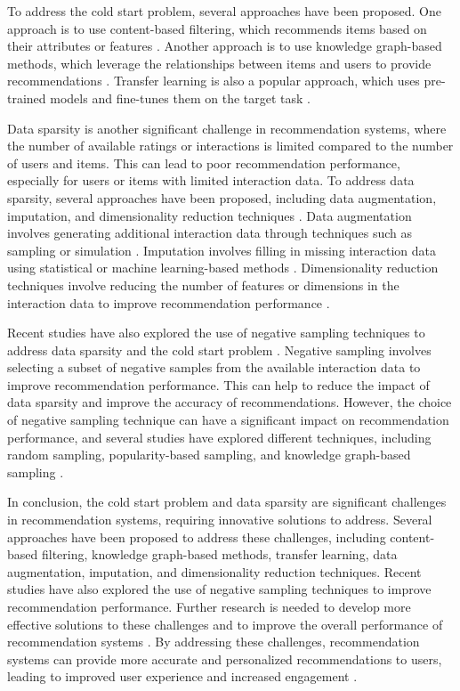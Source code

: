 \documentclass[11pt,a4paper]{article}
\begin{document}
To address the cold start problem, several approaches have been proposed. One approach is to use content-based filtering, which recommends items based on their attributes or features \cite{doi:10.1016/j.knosys.2011.07.021}. Another approach is to use knowledge graph-based methods, which leverage the relationships between items and users to provide recommendations \cite{doi:10.1007/s10115-014-0779-2}. Transfer learning is also a popular approach, which uses pre-trained models and fine-tunes them on the target task \cite{doi:10.1145/3543507.3583495}.

Data sparsity is another significant challenge in recommendation systems, where the number of available ratings or interactions is limited compared to the number of users and items. This can lead to poor recommendation performance, especially for users or items with limited interaction data. To address data sparsity, several approaches have been proposed, including data augmentation, imputation, and dimensionality reduction techniques \cite{doi:10.1587/transinf.2017edr0003}. Data augmentation involves generating additional interaction data through techniques such as sampling or simulation \cite{doi:10.1145/3488560.3498439}. Imputation involves filling in missing interaction data using statistical or machine learning-based methods \cite{doi:10.1002/cpe.7894}. Dimensionality reduction techniques involve reducing the number of features or dimensions in the interaction data to improve recommendation performance \cite{doi:10.1145/3589334.3645371}.

Recent studies have also explored the use of negative sampling techniques to address data sparsity and the cold start problem \cite{doi:10.1145/3331184.3331337}. Negative sampling involves selecting a subset of negative samples from the available interaction data to improve recommendation performance. This can help to reduce the impact of data sparsity and improve the accuracy of recommendations. However, the choice of negative sampling technique can have a significant impact on recommendation performance, and several studies have explored different techniques, including random sampling, popularity-based sampling, and knowledge graph-based sampling \cite{doi:10.1109/tpami.2024.3371473}.

In conclusion, the cold start problem and data sparsity are significant challenges in recommendation systems, requiring innovative solutions to address. Several approaches have been proposed to address these challenges, including content-based filtering, knowledge graph-based methods, transfer learning, data augmentation, imputation, and dimensionality reduction techniques. Recent studies have also explored the use of negative sampling techniques to improve recommendation performance. Further research is needed to develop more effective solutions to these challenges and to improve the overall performance of recommendation systems \cite{doi:10.1145/3340531.3412095}. By addressing these challenges, recommendation systems can provide more accurate and personalized recommendations to users, leading to improved user experience and increased engagement \cite{arxiv:1905.06589}.
\end{document}
